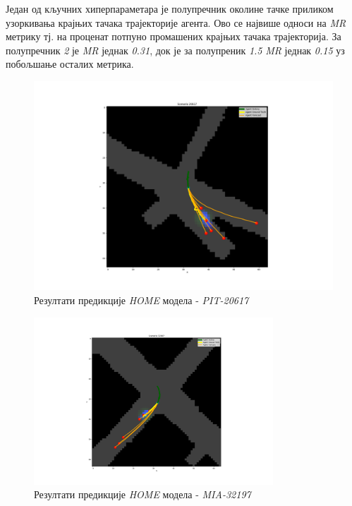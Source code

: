 \documentclass[11pt,oneside]{memoir}
\begin{document}
Један од кључних хиперпараметара је полупречник околине тачке приликом узоркивања крајњих тачака трајекторије агента. Ово се највише
односи на \textit{MR} метрику тј. на проценат потпуно промашених крајњих тачака трајекторија. За полупречник \textit{2} је \textit{MR} једнак \textit{0.31}, док
је за полупреник \textit{1.5} \textit{MR} једнак \textit{0.15} уз побољшање осталих метрика.

\begin{figure}[H]
  \centering
  \includegraphics[width=1.0\textwidth]{images/home_PIT_20617.png}
  \caption{Резултати предикције \textit{HOME} модела - \textit{PIT-20617} \label{home-PIT-20617}}
\end{figure}

\begin{figure}[H]
  \centering
  \includegraphics[width=0.8\textwidth]{images/home_MIA_32197.png}
  \caption{Резултати предикције \textit{HOME} модела - \textit{MIA-32197} \label{home-MIA-32197}}
\end{figure}
\end{document}

